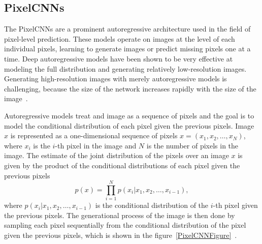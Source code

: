\subsection{PixelCNNs}

The PixelCNNs are a prominent autoregressive architecture used in the field of pixel-level prediction. These models operate on images at the level of each individual pixels, learning to generate images or predict missing pixels one at a time. Deep autoregressive models have been shown to be very effective at modeling the full distribution and generating relatively low-resolution images. Generating high-resolution images with merely autoregressive models is challenging, because the size of the network increases rapidly with the size of the image~\cite{pixelcnn, pixelrnn}.

Autoregressive models treat and image as a sequence of pixels and the goal is to model the conditional distribution of each pixel given the previous pixels.
Image $x$ is represented as a one-dimensional sequence of pixels $x = (x_1, x_2, \dots, x_N)$, where $x_i$ is the $i$-th pixel in the image and $N$ is the number of pixels in the image. The estimate of the joint distribution of the pixels over an image $x$ is given by the product of the conditional distributions of each pixel given the previous pixels
\[ p(x) = \prod_{i=1}^{N} p(x_i|x_1, x_2, \dots, x_{i-1}),\]
where $p(x_i|x_1, x_2, \dots, x_{i-1})$ is the conditional distribution of the $i$-th pixel given the previous pixels. The generational process of the image is then done by sampling each pixel sequentially from the conditional distribution of the pixel given the previous pixels, which is shown in the figure~\ref{PixelCNNFigure}~\cite{pixelcnn}.


